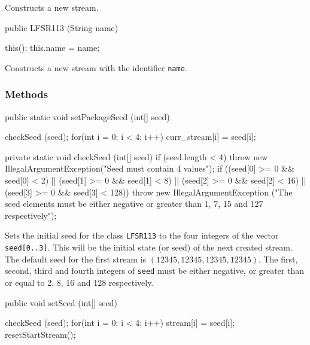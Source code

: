 \begin{tabb} Constructs a new stream.
\end{tabb}
\begin{code}

   public LFSR113 (String name) \begin{hide} {
      this();
      this.name = name;
   }\end{hide}
\end{code}
\begin{tabb} Constructs a new stream with the identifier \texttt{name}.
\end{tabb}
\begin{htmlonly}
\end{htmlonly}

\subsubsection* {Methods}
\begin{code}
   public static void setPackageSeed (int[] seed) \begin{hide} {
      checkSeed (seed);
      for(int i = 0; i < 4; i++)
         curr_stream[i] = seed[i];
   }

   private static void checkSeed  (int[] seed) {
      if (seed.length < 4)
         throw new IllegalArgumentException("Seed must contain 4 values");
      if ((seed[0] >= 0 && seed[0] < 2)  ||
          (seed[1] >= 0 && seed[1] < 8)  ||
          (seed[2] >= 0 && seed[2] < 16) ||
          (seed[3] >= 0 && seed[3] < 128))
         throw new IllegalArgumentException
         ("The seed elements must be either negative or greater than 1, 7, 15 and 127 respectively");
   }\end{hide}
\end{code}
\begin{tabb} Sets the initial seed for the class \texttt{LFSR113} to the four
  integers of the vector \texttt{seed[0..3]}.
  This will be the initial state (or seed) of the next created stream.
  The default seed for the first stream is $(12345, 12345, 12345, 12345)$.
  The first, second, third and fourth integers of \texttt{seed}
  must be either negative, or greater than or equal to
   2, 8, 16 and 128 respectively.
\end{tabb}
\begin{htmlonly}
\end{htmlonly}
\begin{code}

   public void setSeed (int[] seed) \begin{hide} {
      checkSeed  (seed);
      for(int i = 0; i < 4; i++)
         stream[i] = seed[i];
      resetStartStream();
   } \end{hide}
\end{code}
